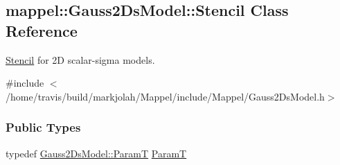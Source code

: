 \hypertarget{classmappel_1_1Gauss2DsModel_1_1Stencil}{}\subsection{mappel\+:\+:Gauss2\+Ds\+Model\+:\+:Stencil Class Reference}
\label{classmappel_1_1Gauss2DsModel_1_1Stencil}


\hyperlink{classmappel_1_1Gauss2DsModel_1_1Stencil}{Stencil} for 2D scalar-\/sigma models.  




{\ttfamily \#include $<$/home/travis/build/markjolah/\+Mappel/include/\+Mappel/\+Gauss2\+Ds\+Model.\+h$>$}

\subsubsection*{Public Types}
\begin{DoxyCompactItemize}
\item 
typedef \hyperlink{classmappel_1_1PointEmitterModel_a665ec6aea3aac139bb69a23c06d4b9a1}{Gauss2\+Ds\+Model\+::\+ParamT} \hyperlink{classmappel_1_1Gauss2DsModel_1_1Stencil_ab23d0622d37f67fb3079dcd7dad848fa}{ParamT}
\end{DoxyCompactItemize}
